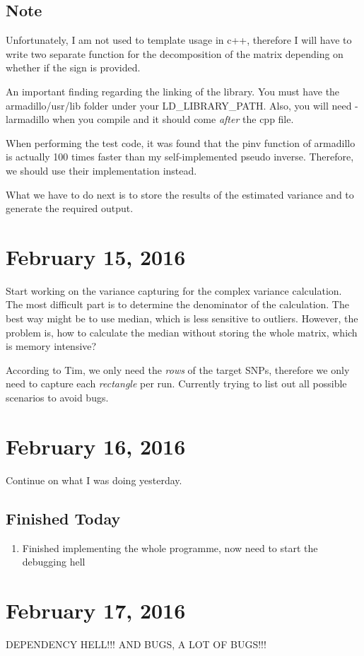 \documentclass[12pt]{article}
\begin{document}
	\subsection{Note}
	Unfortunately, I am not used to template usage in c++, therefore I will have to write two separate function for the decomposition of the matrix depending on whether if the sign is provided.
	
	An important finding regarding the linking of the library.
	You must have the armadillo/usr/lib folder under your LD\_LIBRARY\_PATH.
	Also, you will need -larmadillo when you compile and it should come \emph{after} the cpp file.
	
	When performing the test code, it was found that the pinv function of armadillo is actually 100 times faster than my self-implemented pseudo inverse. 
	Therefore, we should use their implementation instead.
	
	What we have to do next is to store the results of the estimated variance and to generate the required output.
	\section {February 15, 2016}
	Start working on the variance capturing for the complex variance calculation.
	The most difficult part is to determine the denominator of the calculation.
	The best way might be to use median, which is less sensitive to outliers.
	However, the problem is, how to calculate the median without storing the whole matrix, which is memory intensive?
	
	According to Tim, we only need the \emph{rows} of the target SNPs, therefore we only need to capture each \emph{rectangle} per run.
	Currently trying to list out all possible scenarios to avoid bugs.
	
	\section{February 16, 2016}
	Continue on what I was doing yesterday.
	\subsection{Finished Today}
	\begin{enumerate}
		\item Finished implementing the whole programme, now need to start the debugging hell
	\end{enumerate}
	\section{February 17, 2016}
	DEPENDENCY HELL!!!
	AND BUGS, A LOT OF BUGS!!!
\end{document}
